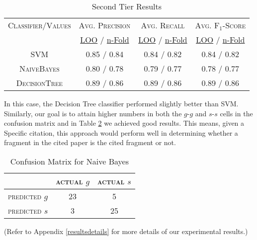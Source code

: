 \begin{table}[h]
	\center
	\begin{tabular}{ c | c  c  c }
		\textsc{Classifier/Values} & \textsc{Avg. Precision} & \textsc{Avg. Recall} & \textsc{Avg. F$_1$-Score} \\
		& \url{LOO} / \url{n-Fold} & \url{LOO} / \url{n-Fold} & \url{LOO} / \url{n-Fold} \\
		\hline
		\textsc{SVM} 			& 0.85 / 0.84 & 0.84 / 0.82 & 0.84 / 0.82 \\
		\textsc{NaiveBayes} 	& 0.80 / 0.78 & 0.79 / 0.77 & 0.78 / 0.77 \\
		\textsc{DecisionTree}	& 0.89 / 0.86 & 0.89 / 0.86 & 0.89 / 0.86
	\end{tabular}
	\caption{Second Tier Results}
	\label{tab:secondtieresults}
\end{table}
\newpage
In this case, the Decision Tree classifier performed slightly better than SVM. Similarly, our goal is to attain higher numbers in both the $g$-$g$ and $s$-$s$ cells in the confusion matrix and in Table \ref{tab:decisiontreeconfusionmatrix} we achieved good results. This means, given a Specific citation, this approach would perform well in determining whether a fragment in the cited paper is the cited fragment or not.

\begin{table}[h]
	\center
	\begin{tabular}{ c | c  c }
		 & \textsc{actual $g$} & \textsc{actual $s$} \\
		\hline
		\textsc{predicted $g$} 	& 23 & 5 \\
		\textsc{predicted $s$}		& 3 & 25
	\end{tabular}
	\caption{Confusion Matrix for Naive Bayes}
	\label{tab:decisiontreeconfusionmatrix}
\end{table}

(Refer to Appendix \ref{resultsdetails} for more details of our experimental results.)